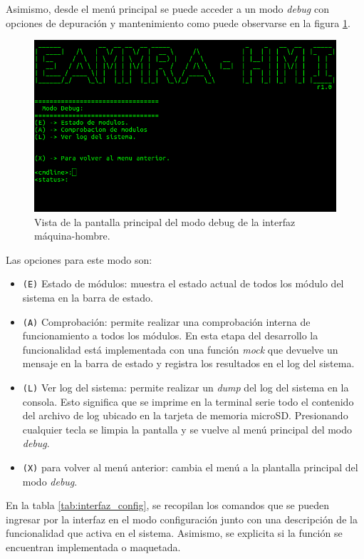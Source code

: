 Asimismo, desde el menú principal se puede acceder a un modo \textit{debug} con opciones de depuración y mantenimiento como puede observarse en la figura \ref{fig:interfaz_debug}.

\begin{figure}[htpb]
	\centering
	\includegraphics[width=\textwidth]{./Figures/interfaz_debug.png}
	\caption{Vista de la pantalla principal del modo debug de la interfaz máquina-hombre.}
	\label{fig:interfaz_debug}
\end{figure}

Las opciones para este modo son:

\begin{itemize}
  \item \texttt{(E)} Estado de módulos: muestra el estado actual de todos los módulo del sistema en la barra de estado.
  \item \texttt{(A)} Comprobación: permite realizar una comprobación interna de funcionamiento a todos los módulos. En esta etapa del desarrollo la funcionalidad está implementada con una función \textit{mock} que devuelve un mensaje en la barra de estado y registra los resultados en el log del sistema.
  \item \texttt{(L)} Ver log del sistema: permite realizar un \textit{dump} del log del sistema en la consola.  Esto significa que se imprime en la terminal serie todo el contenido del archivo de log ubicado en la tarjeta de memoria microSD. Presionando cualquier tecla se limpia la pantalla y se vuelve al menú principal del modo \textit{debug}.
  \item \texttt{(X)} para volver al menú anterior: cambia el menú a la plantalla principal del modo \textit{debug}.
\end{itemize}

En la tabla \ref{tab:interfaz_config}, se recopilan los comandos que se pueden ingresar por la interfaz en el modo configuración junto con una descripción de la funcionalidad que activa en el sistema.  Asimismo, se explicita si la función se encuentran implementada o maquetada.

